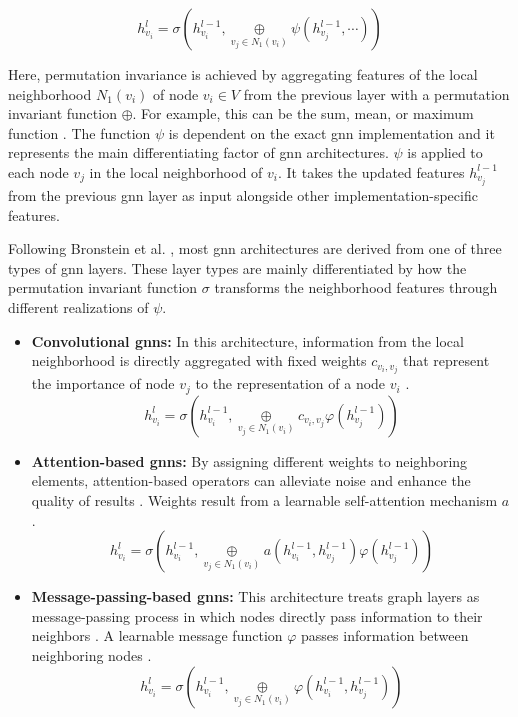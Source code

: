 \begin{equation}
    h_{v_i}^l = \sigma(h_{v_i}^{l-1}, \underset{v_j \in N_1(v_i)}{\oplus} \psi(h_{v_j}^{l-1}, \cdots))
\end{equation}

Here, permutation invariance is achieved by aggregating features of the local neighborhood $N_1(v_i)$ of node $v_i \in V$ from the previous layer with a permutation invariant function $\oplus$. For example, this can be the sum, mean, or maximum function \cite{bronstein_geometric_2021}. The function $\psi$ is dependent on the exact \gls{gnn} implementation and it represents the main differentiating factor of \gls{gnn} architectures. $\psi$ is applied to each node $v_j$ in the local neighborhood of $v_i$. It takes the updated features $h_{v_j}^{l-1}$ from the previous \gls{gnn} layer as input alongside other implementation-specific features.

Following Bronstein et al. \cite{bronstein_geometric_2021}, most \gls{gnn} architectures are derived from one of three types of \gls{gnn} layers. These layer types are mainly differentiated by how the permutation invariant function $\sigma$ transforms the neighborhood features through different realizations of $\psi$.

\begin{itemize}
    \item \textbf{Convolutional \glspl{gnn}:} In this architecture, information from the local neighborhood is directly aggregated with fixed weights $c_{v_i, v_j}$ that represent the importance of node $v_j$ to the representation of a node $v_i$ \cite{bronstein_geometric_2021, wu_comprehensive_2021}.
    \begin{equation}
        h_{v_i}^l = \sigma(h_{v_i}^{l-1}, \underset{v_j \in N_1(v_i)}{\oplus} c_{v_i, v_j} \varphi(h_{v_j}^{l-1}))
    \end{equation}
    
    \item \textbf{Attention-based \glspl{gnn}:} By assigning different weights to neighboring elements, attention-based operators can alleviate noise and enhance the quality of results \cite{zhou_graph_2020}. Weights result from a learnable self-attention mechanism $a$ \cite{bronstein_geometric_2021}.
    \begin{equation}
        h_{v_i}^l = \sigma(h_{v_i}^{l-1}, \underset{v_j \in N_1(v_i)}{\oplus} a(h_{v_i}^{l-1}, h_{v_j}^{l-1}) \varphi(h_{v_j}^{l-1}))
    \end{equation}

    \item \textbf{Message-passing-based \glspl{gnn}:} This architecture treats graph layers as message-passing process in which nodes directly pass information to their neighbors \cite{wu_comprehensive_2021}. A learnable message function $\varphi$ passes information between neighboring nodes \cite{bronstein_geometric_2021}.
    \begin{equation}
        h_{v_i}^l = \sigma(h_{v_i}^{l-1}, \underset{v_j \in N_1(v_i)}{\oplus} \varphi(h_{v_i}^{l-1}, h_{v_j}^{l-1}))
    \end{equation}
\end{itemize}

